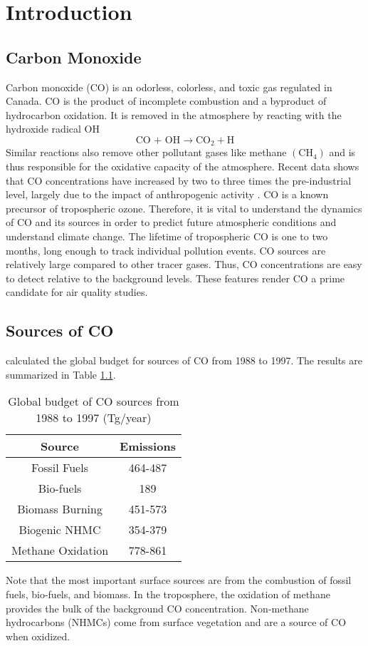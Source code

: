 \chapter{Introduction}

\section{Carbon Monoxide} \label{intro_CO}
Carbon monoxide (CO) is an odorless, colorless, and toxic gas regulated in Canada. CO is the product of incomplete combustion and a byproduct of hydrocarbon oxidation. It is removed in the atmosphere by reacting with the hydroxide radical OH
\begin{equation}
\text{CO + OH} \rightarrow \text{CO}_2 + \text{H}
\end{equation}
Similar reactions also remove other pollutant gases like methane $(\text{CH}_4)$ and is thus responsible for the oxidative capacity of the atmosphere. Recent data shows that CO concentrations have increased by two to three times the pre-industrial level, largely due to the impact of anthropogenic activity \cite{haan1996}. CO is a known precursor of tropospheric ozone. Therefore, it is vital to understand the dynamics of CO and its sources in order to predict future atmospheric conditions and understand climate change. The lifetime of tropospheric CO is one to two months, long enough to track individual pollution events. CO sources are relatively large compared to other tracer gases. Thus, CO concentrations are easy to detect relative to the background levels. These features render CO a prime candidate for air quality studies.
\section{Sources of CO} \label{intro_COSources}
\cite{duncan2007} calculated the global budget for sources of CO from 1988 to 1997. The results are summarized in Table \ref{table:budget}. 
\begin{table}[!ht]
\centering
\begin{tabular}{|c | c|} 
 \hline
 Source & Emissions \\ [0.5ex] 
 \hline\hline
 Fossil Fuels & 464-487  \\ 
 Bio-fuels & 189 \\
 Biomass Burning & 451-573 \\
 Biogenic NHMC & 354-379 \\
 Methane Oxidation & 778-861 \\ [1ex] 
 \hline
\end{tabular}
\caption{Global budget of CO sources from 1988 to 1997 (Tg/year) \cite{duncan2007}}
\label{table:budget}
\end{table}
\noindent Note that the most important surface sources are from the combustion of fossil fuels, bio-fuels, and biomass. In the troposphere, the oxidation of methane provides the bulk of the background CO concentration. Non-methane hydrocarbons (NHMCs) come from surface vegetation and are a source of CO when oxidized. 

